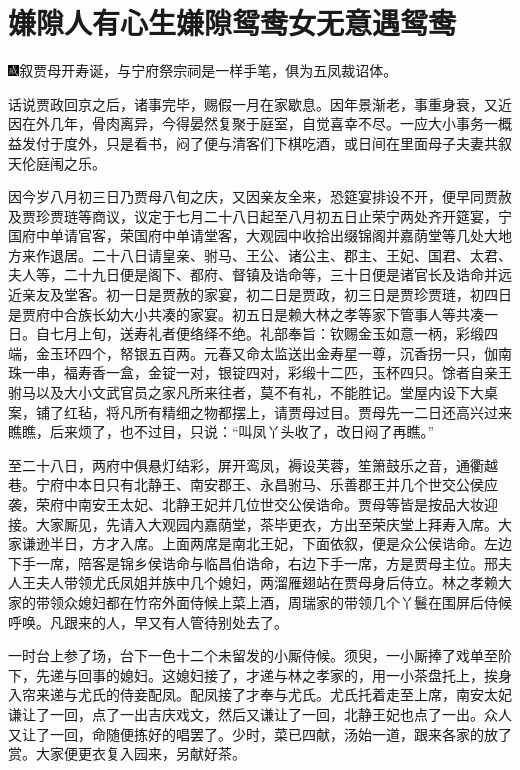 
\chapter{嫌隙人有心生嫌隙\hspace{.5em}鸳鸯女无意遇鸳鸯}

{\includegraphics[width=3mm]{../Images/00005}\kaishu 叙贾母开寿诞，与宁府祭宗祠是一样手笔，俱为五凤裁诏体。}

话说贾政回京之后，诸事完毕，赐假一月在家歇息。因年景渐老，事重身衰，又近因在外几年，骨肉离异，今得晏然复聚于庭室，自觉喜幸不尽。一应大小事务一概益发付于度外，只是看书，闷了便与清客们下棋吃酒，或日间在里面母子夫妻共叙天伦庭闱之乐。

因今岁八月初三日乃贾母八旬之庆，又因亲友全来，恐筵宴排设不开，便早同贾赦及贾珍贾琏等商议，议定于七月二十八日起至八月初五日止荣宁两处齐开筵宴，宁国府中单请官客，荣国府中单请堂客，大观园中收拾出缀锦阁并嘉荫堂等几处大地方来作退居。二十八日请皇亲、驸马、王公、诸公主、郡主、王妃、国君、太君、夫人等，二十九日便是阁下、都府、督镇及诰命等，三十日便是诸官长及诰命并远近亲友及堂客。初一日是贾赦的家宴，初二日是贾政，初三日是贾珍贾琏，初四日是贾府中合族长幼大小共凑的家宴。初五日是赖大林之孝等家下管事人等共凑一日。自七月上旬，送寿礼者便络绎不绝。礼部奉旨：钦赐金玉如意一柄，彩缎四端，金玉环四个，帑银五百两。元春又命太监送出金寿星一尊，沉香拐一只，伽南珠一串，福寿香一盒，金锭一对，银锭四对，彩缎十二匹，玉杯四只。馀者自亲王驸马以及大小文武官员之家凡所来往者，莫不有礼，不能胜记。堂屋内设下大桌案，铺了红毡，将凡所有精细之物都摆上，请贾母过目。贾母先一二日还高兴过来瞧瞧，后来烦了，也不过目，只说：“叫凤丫头收了，改日闷了再瞧。”

至二十八日，两府中俱悬灯结彩，屏开鸾凤，褥设芙蓉，笙箫鼓乐之音，通衢越巷。宁府中本日只有北静王、南安郡王、永昌驸马、乐善郡王并几个世交公侯应袭，荣府中南安王太妃、北静王妃并几位世交公侯诰命。贾母等皆是按品大妆迎接。大家厮见，先请入大观园内嘉荫堂，茶毕更衣，方出至荣庆堂上拜寿入席。大家谦逊半日，方才入席。上面两席是南北王妃，下面依叙，便是众公侯诰命。左边下手一席，陪客是锦乡侯诰命与临昌伯诰命，右边下手一席，方是贾母主位。邢夫人王夫人带领尤氏凤姐并族中几个媳妇，两溜雁翅站在贾母身后侍立。林之孝赖大家的带领众媳妇都在竹帘外面侍候上菜上酒，周瑞家的带领几个丫鬟在围屏后侍候呼唤。凡跟来的人，早又有人管待别处去了。

一时台上参了场，台下一色十二个未留发的小厮侍候。须臾，一小厮捧了戏单至阶下，先递与回事的媳妇。这媳妇接了，才递与林之孝家的，用一小茶盘托上，挨身入帘来递与尤氏的侍妾配凤。配凤接了才奉与尤氏。尤氏托着走至上席，南安太妃谦让了一回，点了一出吉庆戏文，然后又谦让了一回，北静王妃也点了一出。众人又让了一回，命随便拣好的唱罢了。少时，菜已四献，汤始一道，跟来各家的放了赏。大家便更衣复入园来，另献好茶。

